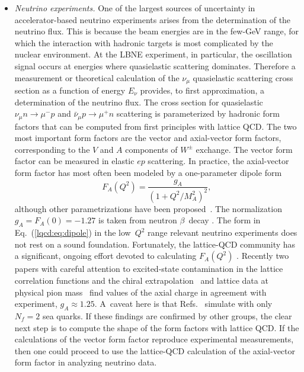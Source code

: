 \begin{itemize}
\item {\it Neutrino experiments.}  One of the largest sources of uncertainty
in accelerator-based neutrino experiments arises from the determination of the
neutrino flux.  This is because the beam energies are in the few-GeV range,
for which the interaction with hadronic targets is most complicated by the
nuclear environment.  At the LBNE experiment, in particular, the oscillation
signal occurs at energies where quasielastic scattering dominates.  Therefore
a measurement or theoretical calculation of the $\nu_\mu$ quasielastic
scattering cross section as a function of energy $E_\nu$ provides, to first
approximation, a determination of the neutrino flux.  The cross section for
quasielastic $\nu_\mu n \to \mu^-p$ and $\bar{\nu}_\mu p\to \mu^+n$ scattering
is parameterized by hadronic form factors that can be computed from first
principles with lattice QCD.  The two most important form factors are the
vector and axial-vector form factors, corresponding to the $V$ and $A$
components of $W^\pm$ exchange.  The vector form factor can be measured in
elastic $ep$ scattering.  In practice, the axial-vector form factor has most
often been modeled by a one-parameter dipole form~\cite{LlewellynSmith:1971zm}
\begin{equation}
    F_A(Q^2) = \frac{g_A}{(1+Q^2/M_A^2)^2},
    \label{lqcd:eq:dipole}
\end{equation}
although other parametrizations have been
proposed~\cite{Kelly:2004hm,Bradford:2006yz,Bodek:2007ym,Bhattacharya:2011ah}.
The normalization $g_A=F_A(0)=-1.27$ is taken from neutron $\beta$~decay
\cite{Beringer:1900zz}.  The form in Eq.~(\ref{lqcd:eq:dipole}) in the
low~$Q^2$ range relevant neutrino experiments does not rest on a sound
foundation.  Fortunately, the lattice-QCD community has a significant, ongoing
effort devoted to calculating $F_A(Q^2)$
\cite{Khan:2006de,Yamazaki:2009zq,Bratt:2010jn,Alexandrou:2010hf,Alexandrou:2013joa}.
Recently two papers with careful attention to excited-state contamination in
the lattice correlation functions and the chiral
extrapolation~\cite{Capitani:2012gj} and lattice data at physical pion
mass~\cite{Horsley:2013ayv} find values of the axial charge in agreement with
experiment, $g_A\approx1.25$.  A~caveat here is that
Refs.~\cite{Capitani:2012gj,Horsley:2013ayv} simulate with only $N_f=2$ sea
quarks.  If these findings are confirmed by other groups, the clear next step
is to compute the shape of the form factors with lattice QCD.  If the
calculations of the vector form factor reproduce experimental measurements,
then one could proceed to use the lattice-QCD calculation of the axial-vector
form factor in analyzing neutrino data.


\end{itemize}
